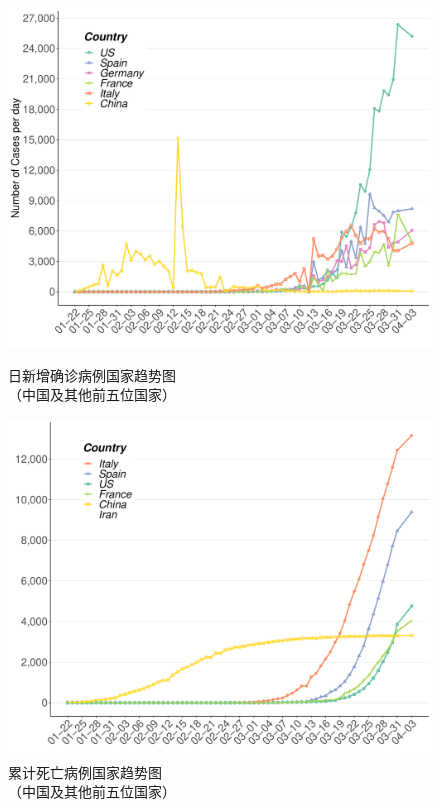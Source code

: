 \documentclass[]{article}
\begin{document}
\begin{figure}[H]
\centering
\begin{minipage}[b]{0.45\linewidth}
\includegraphics[]{./input/table_plot/covid3.pdf}
\caption{日新增确诊病例国家趋势图\\（中国及其他前五位国家）}
\label{}
\end{minipage}
\quad
\begin{minipage}[b]{0.45\linewidth}
\includegraphics[]{./input/table_plot/covid4.pdf}
\caption{累计死亡病例国家趋势图\\（中国及其他前五位国家） }
\label{}
\end{minipage}
\end{figure}
\end{document}

